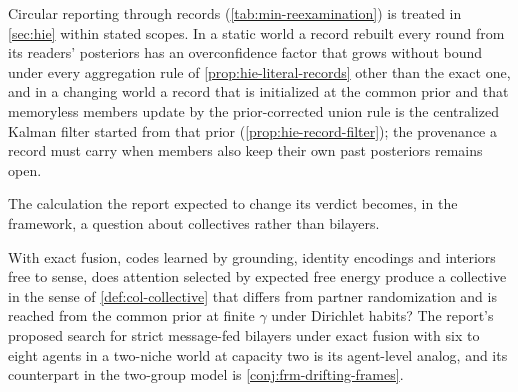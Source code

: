 Circular reporting through records (\cref{tab:min-reexamination}) is treated in \cref{sec:hie} within stated scopes. In a static world a record rebuilt every round from its readers' posteriors has an overconfidence factor that grows without bound under every aggregation rule of \cref{prop:hie-literal-records} other than the exact one, and in a changing world a record that is initialized at the common prior and that memoryless members update by the prior-corrected union rule is the centralized Kalman filter started from that prior (\cref{prop:hie-record-filter}); the provenance a record must carry when members also keep their own past posteriors remains open.

The calculation the report expected to change its verdict becomes, in the framework, a question about collectives rather than bilayers.

\begin{openproblem}\label{open:min-exact-fusion}
With exact fusion, codes learned by grounding, identity encodings and interiors free to sense, does attention selected by expected free energy produce a collective in the sense of \cref{def:col-collective} that differs from partner randomization and is reached from the common prior at finite $\gamma$ under Dirichlet habits? The report's proposed search for strict message-fed bilayers under exact fusion with six to eight agents in a two-niche world at capacity two is its agent-level analog, and its counterpart in the two-group model is \cref{conj:frm-drifting-frames}.
\end{openproblem}
